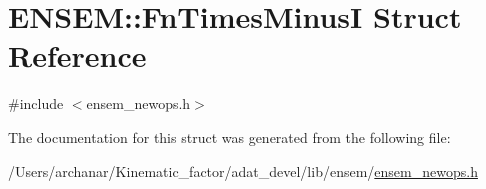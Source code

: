 \hypertarget{structENSEM_1_1FnTimesMinusI}{}\section{E\+N\+S\+EM\+:\+:Fn\+Times\+MinusI Struct Reference}
\label{structENSEM_1_1FnTimesMinusI}


{\ttfamily \#include $<$ensem\+\_\+newops.\+h$>$}



The documentation for this struct was generated from the following file\+:\begin{DoxyCompactItemize}
\item 
/\+Users/archanar/\+Kinematic\+\_\+factor/adat\+\_\+devel/lib/ensem/\mbox{\hyperlink{lib_2ensem_2ensem__newops_8h}{ensem\+\_\+newops.\+h}}\end{DoxyCompactItemize}
